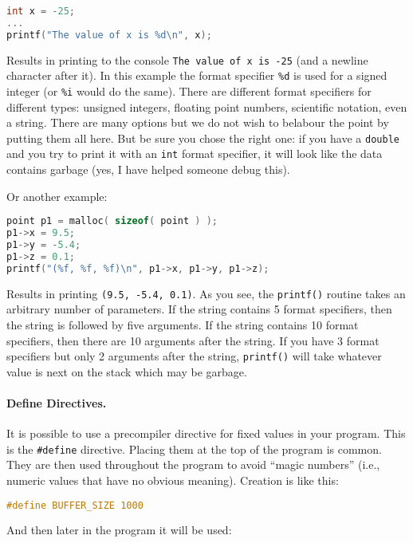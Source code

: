 \begin{lstlisting}[language=C]
int x = -25;
...
printf("The value of x is %d\n", x);
\end{lstlisting}

Results in printing to the console \texttt{The value of x is -25} (and a newline character after it). In this example the format specifier \texttt{\%d} is used for a signed integer (or \texttt{\%i} would do the same). There are different format specifiers for different types: unsigned integers, floating point numbers, scientific notation, even a string. There are many options but we do not wish to belabour the point by putting them all here. But be sure you chose the right one: if you have a \texttt{double} and you try to print it with an \texttt{int} format specifier, it will look like the data contains garbage (yes, I have helped someone debug this).

Or another example:
\begin{lstlisting}[language=C]
point p1 = malloc( sizeof( point ) );
p1->x = 9.5;
p1->y = -5.4;
p1->z = 0.1;
printf("(%f, %f, %f)\n", p1->x, p1->y, p1->z);
\end{lstlisting}

Results in printing \texttt{(9.5, -5.4, 0.1)}. As you see, the \texttt{printf()} routine takes an arbitrary number of parameters. If the string contains 5 format specifiers, then the string is followed by five arguments. If the string contains 10 format specifiers, then there are 10 arguments after the string. If you have 3 format specifiers but only 2 arguments after the string, \texttt{printf()} will take whatever value is next on the stack which may be garbage.

\paragraph{Define Directives.}

It is possible to use a precompiler directive for fixed values in your program. This is the \texttt{\#define} directive. Placing them at the top of the program is common. They are then used throughout the program to avoid ``magic numbers'' (i.e., numeric values that have no obvious meaning). Creation is like this:

\begin{lstlisting}[language=C]
#define BUFFER_SIZE 1000
\end{lstlisting}

And then later in the program it will be used:

